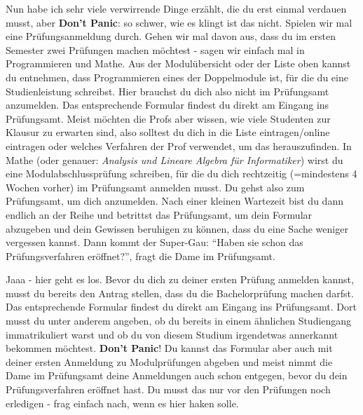 Nun habe ich sehr viele verwirrende Dinge erzählt, die du erst einmal verdauen musst, aber \textbf{Don't Panic}: so schwer, wie es klingt ist das nicht.
Spielen wir mal eine Prüfungsanmeldung durch.
Gehen wir mal davon aus, dass du im ersten Semester zwei Prüfungen machen möchtest - sagen wir einfach mal in Programmieren und Mathe.
Aus der Modulübersicht oder der Liste oben kannst du entnehmen, dass Programmieren eines der Doppelmodule ist, für die du eine Studienleistung schreibst.
Hier brauchst du dich also nicht im Prüfungsamt anzumelden.
Das entsprechende Formular findest du direkt am Eingang ins Prüfungsamt.
Meist möchten die Profs aber wissen, wie viele Studenten zur Klausur zu erwarten sind, also solltest du dich in die Liste eintragen/online eintragen oder welches Verfahren der Prof verwendet, um das herauszufinden.
In Mathe (oder genauer: \emph{Analysis und Lineare Algebra für Informatiker}) wirst du eine Modulabschlussprüfung schreiben, für die du dich rechtzeitig (=mindestens 4 Wochen vorher) im Prüfungsamt anmelden musst.
Du gehst also zum Prüfungsamt, um dich anzumelden. 
Nach einer kleinen Wartezeit bist du dann endlich an der Reihe und betrittst das Prüfungsamt, um dein Formular abzugeben und dein Gewissen beruhigen zu können, dass du eine Sache weniger vergessen kannst.
Dann kommt der Super-Gau:
``Haben sie schon das Prüfungsverfahren eröffnet?'', fragt die Dame im Prüfungsamt.

Jaaa - hier geht es los.
Bevor du dich zu deiner ersten Prüfung anmelden kannst, musst du bereits den Antrag stellen, dass du die Bachelorprüfung machen darfst.
Das entsprechende Formular findest du direkt am Eingang ins Prüfungsamt.
Dort musst du unter anderem angeben, ob du bereits in einem ähnlichen Studiengang immatrikuliert warst und ob du von diesem Studium irgendetwas annerkannt bekommen möchtest.
\textbf{Don't Panic}!
Du kannst das Formular aber auch mit deiner ersten Anmeldung zu Modulprüfungen abgeben und meist nimmt die Dame im Prüfungsamt deine Anmeldungen auch schon entgegen, bevor du dein Prüfungsverfahren eröffnet hast. 
Du musst das nur vor den Prüfungen noch erledigen - frag einfach nach, wenn es hier haken solle.

